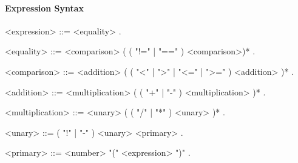 \documentclass[11pt]{scrartcl}
\begin{document}
    \paragraph{Expression Syntax}
    \begin{grammar}
        <expression> ::= <equality> .

        <equality> ::= <comparison> ( ( "!=" | "==" ) <comparison>)* .

        <comparison> ::= <addition> ( ( "<" | ">" | "<=" | ">=" ) <addition> )* .

        <addition> ::= <multiplication> ( ( "+" | "-" ) <multiplication> )* .

        <multiplication> ::= <unary> ( ( "/" | "*" ) <unary> )* .

        <unary> ::= ( "!" | "-" ) <unary> \alt <primary> .

        <primary> ::= <number>
        \alt "(" <expression> ")" .
    \end{grammar}
\end{document}
